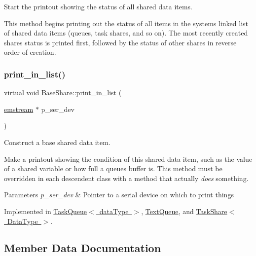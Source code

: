 Start the printout showing the status of all shared data items. 

This method begins printing out the status of all items in the system\textquotesingle{}s linked list of shared data items (queues, task shares, and so on). The most recently created share\textquotesingle{}s status is printed first, followed by the status of other shares in reverse order of creation. \mbox{\label{class_base_share_a81ef685c8c1897ee316e853103e9941a}} 
\subsubsection{\texorpdfstring{print\+\_\+in\+\_\+list()}{print\_in\_list()}}
{\footnotesize\ttfamily virtual void Base\+Share\+::print\+\_\+in\+\_\+list (\begin{DoxyParamCaption}\item[{\mbox{\hyperlink{classemstream}{emstream}} $\ast$}]{p\+\_\+ser\+\_\+dev }\end{DoxyParamCaption})\hspace{0.3cm}{\ttfamily [pure virtual]}}



Construct a base shared data item. 

Make a printout showing the condition of this shared data item, such as the value of a shared variable or how full a queue\textquotesingle{}s buffer is. This method must be overridden in each descendent class with a method that actually {\itshape does} something. 
\begin{DoxyParams}{Parameters}
{\em p\+\_\+ser\+\_\+dev} & Pointer to a serial device on which to print things \\
\hline
\end{DoxyParams}


Implemented in \mbox{\hyperlink{class_task_queue_ad5ccb9c99ca4f43304d408d915314d71}{Task\+Queue$<$ data\+Type $>$}}, \mbox{\hyperlink{class_text_queue_aeef41a1bc3486d98fb31cba9ce539d0d}{Text\+Queue}}, and \mbox{\hyperlink{class_task_share_a08835a91ed7ccd847cefe6ff72fe22e6}{Task\+Share$<$ Data\+Type $>$}}.



\subsection{Member Data Documentation}
\mbox{\label{class_base_share_a3da759fb6f803ddb8e3883435d91d29a}} 
